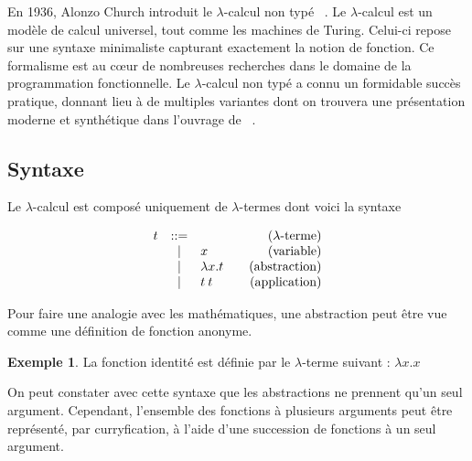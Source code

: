 \documentclass {article}
\makeatletter
\theoremstyle{definition}
\newtheorem{example}{Exemple}
\theoremstyle{remark}
\newenvironment{bnf}
               {\[\begin{array}{lcl@{\qquad}r}}
               {\end{array}\]}
\makeatother
\begin{document}
En 1936, Alonzo Church introduit le $\lambda$-calcul non typé
~\citep{church:lambda-calcul}. Le $\lambda$-calcul est
un modèle de calcul universel, tout comme les machines de Turing. Celui-ci repose
sur une syntaxe minimaliste capturant exactement la notion de fonction. Ce formalisme est au c\oe{}ur de nombreuses recherches dans le domaine de la 
programmation fonctionnelle. Le $\lambda$-calcul non typé a connu un formidable 
succès pratique, donnant lieu à de multiples variantes dont on trouvera une présentation
 moderne et synthétique dans l'ouvrage de ~\citet{pierce:tapl}.

\subsection{Syntaxe}
Le $\lambda$-calcul est composé uniquement de \(\lambda\)-termes dont voici la syntaxe

\newcommand{\Lam}[2]{\ensuremath{\lambda #1. #2}}
\newcommand{\App}[2]{\ensuremath{#1\:#2}}
\newcommand{\Var}[1]{\ensuremath{#1}}
\newcommand{\Fst}[1]{\ensuremath{#1.\pi_0}}
\newcommand{\Snd}[1]{\ensuremath{#1.\pi_1}}
\newcommand{\Pair}[2]{\ensuremath{(#1, #2)}}
\newcommand{\ifte}[4][]{\ensuremath{\mathsf{if}_{#1}\: #2\: \mathsf{then}\: #3\: \mathsf{else}\: #4}}
\newcommand{\true}{\ensuremath{\mathsf{true}}}
\newcommand{\false}{\ensuremath{\mathsf{false}}}
\newcommand{\zero}{\ensuremath{\mathsf{zero}}} 
\newcommand{\succs}{\ensuremath{\mathsf{succ}}}
\newcommand{\iter}{\ensuremath{\mathsf{iter}}}


\begin{bnf}
  t &::= & &\mbox{($\lambda$-terme)} \\
  &|& \Var{x} & \mbox{(variable)} \\
  &|& \Lam{x}{t} & \mbox{(abstraction)} \\
  &|& \App{t}{t}          & \mbox{(application)}
\end{bnf}

Pour faire une analogie avec les mathématiques, une abstraction peut
être vue comme une définition de fonction anonyme.

\begin{example}
 La fonction identité est définie par le $\lambda$-terme suivant : $\Lam{x}{\Var{x}}$
\end{example}

On peut constater avec cette syntaxe que les abstractions ne prennent
qu'un seul argument. Cependant, l'ensemble des fonctions à plusieurs
arguments peut être représenté, par curryfication, à l'aide d'une
succession de fonctions à un seul argument.
\end{document}
